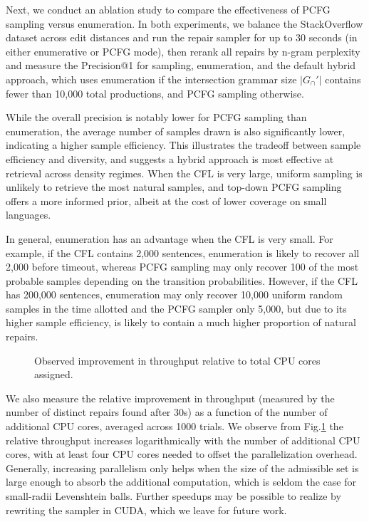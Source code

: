 \documentclass[sigplan,review,acmsmall,nonacm,anonymous]{acmart}\settopmatter{printfolios=false,printccs=false,printacmref=false}
\begin{document}
  Next, we conduct an ablation study to compare the effectiveness of PCFG sampling versus enumeration. In both experiments, we balance the StackOverflow dataset across edit distances and run the repair sampler for up to 30 seconds (in either enumerative or PCFG mode), then rerank all repairs by n-gram perplexity and measure the Precision@1 for sampling, enumeration, and the default hybrid approach, which uses enumeration if the intersection grammar size $|G_\cap'|$ contains fewer than 10,000 total productions, and PCFG sampling otherwise.

  \begin{figure}[h]
    
    
    
  \end{figure}

  While the overall precision is notably lower for PCFG sampling than enumeration, the average number of samples drawn is also significantly lower, indicating a higher sample efficiency. This illustrates the tradeoff between sample efficiency and diversity, and suggests a hybrid approach is most effective at retrieval across density regimes. When the CFL is very large, uniform sampling is unlikely to retrieve the most natural samples, and top-down PCFG sampling offers a more informed prior, albeit at the cost of lower coverage on small languages.

  In general, enumeration has an advantage when the CFL is very small. For example, if the CFL contains 2,000 sentences, enumeration is likely to recover all 2,000 before timeout, whereas PCFG sampling may only recover 100 of the most probable samples depending on the transition probabilities. However, if the CFL has 200,000 sentences, enumeration may only recover 10,000 uniform random samples in the time allotted and the PCFG sampler only 5,000, but due to its higher sample efficiency, is likely to contain a much higher proportion of natural repairs.

  \begin{figure}
    
    \caption{Observed improvement in throughput relative to total CPU cores assigned.}
    \label{fig:speedup}
  \end{figure}

  We also measure the relative improvement in throughput (measured by the number of distinct repairs found after 30s) as a function of the number of additional CPU cores, averaged across 1000 trials. We observe from Fig.\ref{fig:speedup} the relative throughput increases logarithmically with the number of additional CPU cores, with at least four CPU cores needed to offset the parallelization overhead. Generally, increasing parallelism only helps when the size of the admissible set is large enough to absorb the additional computation, which is seldom the case for small-radii Levenshtein balls. Further speedups may be possible to realize by rewriting the sampler in CUDA, which we leave for future work.
\end{document}
